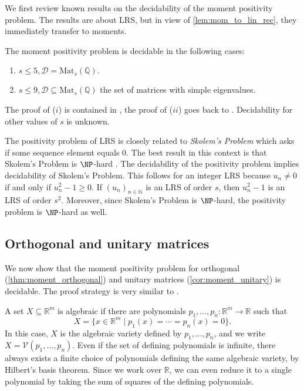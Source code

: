 We first review known results on the decidability of the moment positivity problem. The results are about LRS, but in view of \cref{lem:mom_to_lin_rec}, they immediately transfer to moments. 

\begin{theorem}
\label{thm:moment_decidable_1}
The moment positivity problem is decidable in the following cases:
\begin{enumerate}[label=$(\roman*)$]
	\item $s\leqslant 5, \mathcal D=\mathrm{Mat}_s(\mathbb Q).$  
	\item $s\leqslant 9, \mathcal D\subseteq\mathrm{Mat}_s(\mathbb Q)$ the set of matrices with simple eigenvalues.
	\end{enumerate}
\end{theorem}
The proof of ($i$) is contained in \cite{OW}, the proof of ($ii$) goes back to \cite{OW2}. 
Decidability for other values of $s$ is unknown.

The positivity problem of LRS is closely related to \emph{Skolem's Problem} which asks if some sequence element equals $0$. The best result in this context is that Skolem's Problem is $\NP$-hard \cite{Bl01}. The decidability of the positivity problem implies decidability of Skolem's Problem. This follows for an integer LRS because $u_n \neq 0$  if and only if $u_n^2 - 1 \geqslant 0$. If $(u_n)_{n \in \mathbb{N}}$ is an LRS of order $s$, then $u_n^2 - 1$ is an LRS of order $s^2$. Moreover, since Skolem's Problem is $\NP$-hard, the positivity problem is $\NP$-hard as well.

\subsection{Orthogonal and unitary matrices}
\label{ssec:unitary}

We now show that the moment positivity problem for orthogonal (\cref{thm:moment_orthogonal}) and unitary matrices (\cref{cor:moment_unitary}) is decidable. The proof strategy is very similar to \cite{Bl03}.

A set $X \subseteq \mathbb{R}^m$ is algebraic if there are polynomials $p_1, \ldots, p_n\colon \mathbb{R}^m\to \mathbb{R}$ such that
$$X = \{x \in \mathbb{R}^m\mid p_1(x) = \cdots = p_n(x) = 0\}.$$
In this case, $X$ is the algebraic variety defined by $p_1, \ldots, p_n$, and we write $X = \mathcal{V}(p_1, \ldots, p_n)$. Even if the set of defining polynomials is infinite, there always exists a finite choice of polynomials defining the same algebraic variety, by Hilbert's basis theorem. Since we work over $\mathbb R$, we can even reduce it to a single polynomial by taking the sum of squares of the defining polynomials. 

